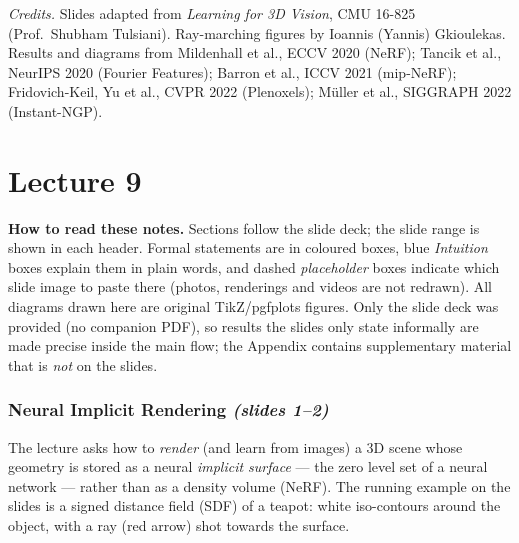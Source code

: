 \documentclass[11pt,a4paper]{article}
\theoremstyle{definition}
\theoremstyle{plain}
\theoremstyle{remark}
\begin{document}
\vfill
\small\textit{Credits.} Slides adapted from \emph{Learning for 3D Vision}, CMU 16-825 (Prof.\ Shubham Tulsiani). Ray-marching figures by Ioannis (Yannis) Gkioulekas. Results and diagrams from Mildenhall et al., ECCV 2020 (NeRF); Tancik et al., NeurIPS 2020 (Fourier Features); Barron et al., ICCV 2021 (mip-NeRF); Fridovich-Keil, Yu et al., CVPR 2022 (Plenoxels); M\"uller et al., SIGGRAPH 2022 (Instant-NGP).

\newpage

\setcounter{section}{0}
\renewcommand{\thesection}{\arabic{section}}
\part{Lecture 9}

\begin{center}
\begin{minipage}{0.9\linewidth}\small
\textbf{How to read these notes.} Sections follow the slide deck; the slide range is shown in each header.
Formal statements are in coloured boxes, blue \emph{Intuition} boxes explain them in plain words, and dashed
\emph{placeholder} boxes indicate which slide image to paste there (photos, renderings and videos are not redrawn).
All diagrams drawn here are original TikZ/pgfplots figures. Only the slide deck was provided (no companion PDF),
so results the slides only state informally are made precise inside the main flow; the Appendix contains
supplementary material that is \emph{not} on the slides.
\end{minipage}
\end{center}

\newpage

\section{Neural Implicit Rendering \emph{(slides 1--2)}}
The lecture asks how to \emph{render} (and learn from images) a 3D scene whose geometry is stored as a neural
\emph{implicit surface} --- the zero level set of a neural network --- rather than as a density volume (NeRF).
The running example on the slides is a signed distance field (SDF) of a teapot: white iso-contours around the
object, with a ray (red arrow) shot towards the surface.
\end{document}
